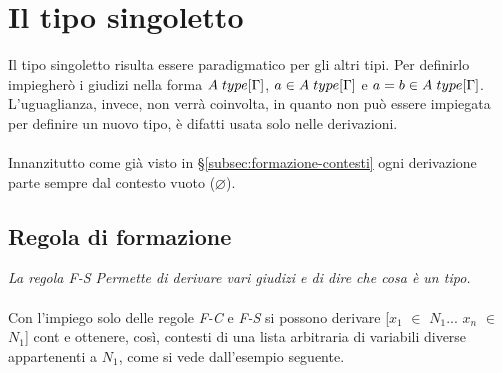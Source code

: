 \documentclass[10pt,a4paper, italian]{book}
\begin{document}
{{\section{Il tipo singoletto}
\label{sec:tipo-singoletto}
Il tipo singoletto risulta essere paradigmatico per gli altri tipi. Per definirlo impiegher\`o i giudizi nella forma $A\hspace{0.1cm}type[\Gamma]$, $a \in A\hspace{0.1cm}type[\Gamma]$ e $a = b \in A\hspace{0.1cm}type[\Gamma]$. L'uguaglianza, invece, non verr\`a coinvolta, in quanto non pu\`o essere impiegata per definire un nuovo tipo, \`e difatti usata solo nelle derivazioni.\\\\
Innanzitutto come gi\`a visto in \S\ref{subsec:formazione-contesti} ogni derivazione parte sempre dal contesto vuoto ($\varnothing$).
\begin{prooftree}
\end{prooftree}

\subsection{Regola di formazione}
\label{subsec:formazione}
\begin{prooftree}
\end{prooftree}
\textit{La regola F-S Permette di derivare vari giudizi e di dire che cosa \`e un tipo.}\\\\
Con l'impiego solo delle regole \textit{F-C} e \textit{F-S} si possono derivare [$x_1$ $\in$ $N_1$... $x_n$ $\in$ $N_1$] cont e ottenere, cos\`i, contesti di una lista arbitraria di variabili diverse appartenenti a $N_1$, come si vede dall'esempio seguente.
\begin{prooftree}
\end{prooftree}

}}
\end{document}
